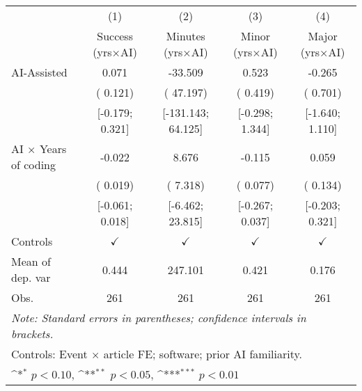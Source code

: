 \def\sym#1{\ifmmode^{#1}\else\(^{#1}\)\fi}
\begin{tabular}{l*{4}{c}}
\hline\hline
 & (1) & (2) & (3) & (4)
\\
 & Success (yrs×AI) & Minutes (yrs×AI) & Minor (yrs×AI) & Major (yrs×AI)
 \\
\hline
AI-Assisted &  0.071 & -33.509 &  0.523 & -0.265
\\
 & ( 0.121) & ( 47.197) & ( 0.419) & ( 0.701)
\\
 & [-0.179;  0.321] & [-131.143;  64.125] & [-0.298;  1.344] & [-1.640;  1.110]
\\
AI × Years of coding & -0.022 &  8.676 & -0.115 &  0.059
\\
 & ( 0.019) & ( 7.318) & ( 0.077) & ( 0.134)
\\
 & [-0.061;  0.018] & [-6.462;  23.815] & [-0.267;  0.037] & [-0.203;  0.321]
\\
\hline
Controls & $\checkmark$ & $\checkmark$ & $\checkmark$ & $\checkmark$
\\
Mean of dep. var &  0.444 &  247.101 &  0.421 &  0.176
\\
Obs. & 261 & 261 & 261 & 261
\\
\hline
\hline\hline
\multicolumn{5}{l}{\it{Note:} Standard errors in parentheses; confidence intervals in brackets.}\\
\multicolumn{5}{l}{Controls: Event $\times$ article FE; software; prior AI familiarity.}\\
\multicolumn{5}{l}{\sym{*} $p<0.10$, \sym{**} $p<0.05$,  \sym{***} $p<0.01$}\\
\end{tabular}
